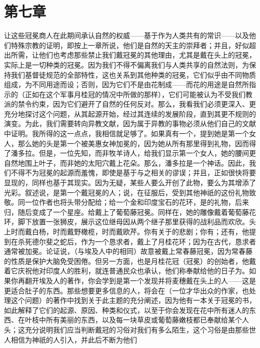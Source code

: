 
\section{第七章}

让这些冠冕商人在此期间承认自然的权威——基于作为人类共有的常识——以及他们特殊宗教的证明，即按上一章所说，他们是自然的天主的崇拜者；并且，好似超出所需，让他们也考虑那些禁止我们戴冠冕的其他理由，尤其是戴在头上的冠冕，实际上是一切种类的冠冕。因为我们不得不偏离我们与人类共享的自然法则，为保持我们基督徒规范的全部特性，这也关系到其他种类的冠冕，它们似乎由不同物质组成，为不同用途而设；否则，因为它们不是由花制成——而花的用途是自然所指示的（正如在这个军事月桂冠的情况中所做的那样），它们可能被认为不受我们教派的禁令约束，因为它们避开了自然的任何反对。那么，我看我们必须更深入、更充分地探讨这个问题，从其起源开始，经过其连续的发展阶段，直到其更不规则的演变。为此，我们需要转向异教文献，因为属于异教的事物必须从他们自己的文献中证明。我所得的这一点点，我相信就足够了。如果真有一个，提到她是第一个女人，那么她的头是第一个被美惠女神加冕的，因为她从所有那里得到礼物，因而得了潘多拉。但是，一位先知，而非牧羊诗人，给我们显示第一个女人，她的腰间更自然地围上叶子，而非她的太阳穴戴上花朵。那么，潘多拉是一个神话。因此，我们不得不为冠冕的起源而羞愧，即使是基于与之相关的谬误；并且，正如很快将要显现的，同样也基于其现实。因为无疑，某些人要么开创了此物，要么为其增添了光彩。叙述说，是第一个戴冠冕的人；说，在征服后，受到其他神祇的这份礼物致敬。同一位作者也将头带分配给；给一个金和印度宝石的花环，是的礼物，后来归，随后变成了一个星座。给戴上了葡萄藤冠冕。同样在，她的雕像戴着葡萄藤花环，脚下放置一张狮皮，展示这位继母因从两个继子那里获得的战利品而欢欣。头上时而戴白杨，时而戴野橄榄，时而戴欧芹。你有关于的悲剧；你有；还有，他提到在杀死德尔斐之蛇后，作为一个恳求者，戴上了月桂花环；因为在古代，恳求者通常被加冕。论证说，（与埃及人中的相同）故意被戴上常春藤冠冕，因为常春藤的性质是保护大脑免受困倦。但另一方面，也是月桂花冠（冠冕）的创始者，他戴着它庆祝他对印度人的胜利，就连普通民众也承认，他们称奉献给他的日子为。如果你再翻开埃及人的著作，你会学到是第一个发现并将麦穗戴在头上的人——这是更适合肚子的东西。那些想要更多信息的人，将会在（一位才华出众的作家，也处理这个问题）的著作中找到关于此主题的充分阐述，因为他有一本关于冠冕的书，如此解释了它们的起源、原因、种类和仪式，以至于你会发现在花中所有迷人的东西、在叶枝中所有美丽的东西，以及每一块草皮或葡萄藤嫩枝都已奉献给某个人头；这充分说明我们应当判断戴冠的习俗对我们有多么陌生，这个习俗是由那些世人相信为神祇的人引入，并此后不断为他们